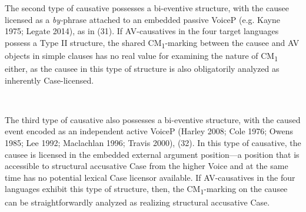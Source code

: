 \documentclass[10pt]{article}
\begin{document}
The second type of causative  possesses a bi-eventive structure, with the causee licensed as a \textit{by-}phrase attached to an embedded passive VoiceP (e.g. Kayne 1975; Legate 2014), as in (31). If AV-causatives in the four target languages possess a Type II structure, the shared CM\textsubscript{1}-marking between the causee and AV objects in simple clauses has no real value for examining the nature of CM\textsubscript{1} either, as the causee in this type of structure is also obligatorily analyzed as inherently Case-licensed. 

 \begin{exe}
 \\
 \begin{minipage}[t]{.4\textwidth}
\begin{enumerate}

 
\end{enumerate}
\end{minipage}%
 \end{exe}

The third type of causative also possesses a bi-eventive structure, with the caused event encoded as an independent active VoiceP (Harley 2008; Cole 1976; Owens 1985; Lee 1992; Maclachlan 1996; Travis 2000),  (32). In this type of causative, the causee is licensed in the embedded external argument position---a position that is accessible to structural accusative Case from the higher Voice and at the same time has no potential lexical Case licensor available. If AV-causatives in the four languages exhibit this type of structure, then, the CM\textsubscript{1}-marking on the causee can be straightforwardly analyzed as realizing structural accusative Case.
\end{document}
